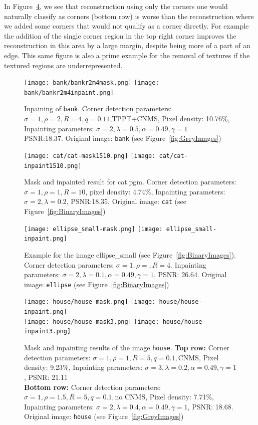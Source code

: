 In Figure~\ref{fig:HouseEx}, we see that reconstruction using only the corners one would naturally
classify as corners (bottom row) is worse than the reconstruction where we added some corners that
would not qualify as a corner directly. For example the addition of the single corner region in the
top right corner improves the reconstruction in this area by a large margin, despite being more of
a part of an edge.
This same figure is also a prime example for the removal of textures if the textured regions are
underrepresented.
\begin{figure}[htpb]
    \centering
    \texttt{[image: bank/bankr2m4mask.png]}
    \texttt{[image: bank/bankr2m4inpaint.png]}\\\vspace{0.2cm}
    \caption{Inpaining of \texttt{bank}. Corner detection parameters:
        $\sigma=1,\rho=2,R=4,q=0.11$,TPPT+CNMS,
    Pixel density: 10.76\%, Inpainting parameters: $\sigma=2,\lambda=0.5,\alpha=0.49,\gamma=1$\\
PSNR:\@18.37. Original image: \texttt{bank} (see Figure~\ref{fig:GreyImages})}\label{fig:BankEx}
\end{figure}
\begin{figure}[h]
    \centering
    \texttt{[image: cat/cat-mask1510.png]}\hspace{0.2cm}
    \texttt{[image: cat/cat-inpaint1510.png]}
    \caption{Mask and inpainted result for cat.pgm. Corner detection parameters:
    $\sigma=1,\rho=1,R=10$, pixel density: 4.74\%, Inpainting parameters: $\sigma=2,\lambda=0.2$,
PSNR:\@18.35. Original image: \texttt{cat} (see Figure~\ref{fig:BinaryImages})}\label{fig:CatExample}
\end{figure}
\begin{figure}[h]
    \centering
    \texttt{[image: ellipse\_small-mask.png]}
    \texttt{[image: ellipse\_small-inpaint.png]}
    \caption{Example for the image ellipse\_small (see Figure~\ref{fig:BinaryImages}). Corner
    detection parameters: $\sigma=1,\rho=,R=4$. Inpainting parameters:
$\sigma=2,\lambda=0.1,\alpha=0.49,\gamma=1$. PSNR\@: 26.64. Original image: \texttt{ellipse} (see
Figure~\ref{fig:BinaryImages})}\label{fig:EllipseSmallExample}
\end{figure}
\begin{figure}[ht]
    \centering
    \texttt{[image: house/house-mask.png]}
    \texttt{[image: house/house-inpaint.png]}\\\vspace*{0.2cm}
    \texttt{[image: house/house-mask3.png]}
    \texttt{[image: house/house-inpaint3.png]}
    \caption{Mask and inpainting results of the image \texttt{house}. 
        \textbf{Top row: }Corner detection parameters: $\sigma=1,\rho=1,R=5,q=0.1, \text{CNMS}$, Pixel density: 9.23\%, Inpainting parameters:
    $\sigma=3,\lambda=0.2,\alpha=0.49,\gamma=1$, PSNR\@: 21.11\\
    \textbf{Bottom row: }Corner detection parameters: $\sigma=1,\rho=1.5,R=5,q=0.1, \text{no
    CNMS}$, Pixel density: 7.71\%, Inpainting parameters:
$\sigma=2,\lambda=0.4,\alpha=0.49,\gamma=1$, PSNR\@: 18.68. Original image: \texttt{house} (see
Figure~\ref{fig:GreyImages})}\label{fig:HouseEx}
\end{figure}
